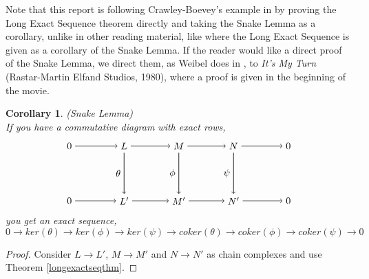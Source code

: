 \documentclass[11.5pt, twoside, a4paper, titlepage]{report}
\theoremstyle{definition}
\theoremstyle{plain}
\newtheorem{cor}[mydef]{Corollary}
\begin{document}
Note that this report is following Crawley-Boevey's example in \cite{CB1} by proving the Long Exact Sequence theorem directly and taking the Snake Lemma as a corollary, unlike in other reading material, like \cite{Weibel} where the Long Exact Sequence is given as a corollary of the Snake Lemma. If the reader would like a direct proof of the Snake Lemma, we direct them, as Weibel does in \cite{Weibel}, to \emph{It's My Turn} (Rastar-Martin Elfand Studios, 1980), where a proof is given in the beginning of the movie.

\begin{cor} (Snake Lemma)\\
If you have a commutative diagram with exact rows, 
\begin{equation*}
\begin{tikzpicture}[->,-latex, auto, main path/.style={->, semithick}, main node/.style={}]

\node	[main node]		(2) at (2,0)		{$0$};
\node	[main node]		(3) at (4,0)		{$L$};
\node [main node]		(4) at (6,0)		{$M$};
\node [main node]		(5) at (8,0)		{$N$};
\node	[main node]		(11) at (10,0)	{$0$};


\node	[main node]		(7) at (2,-2)		{$0$};
\node	[main node]		(8) at (4,-2)		{$L'$};
\node [main node]		(9) at (6,-2)		{$M'$};
\node [main node]		(10) at (8,-2)	{$N'$};
\node [main node]		(13) at (10,-2)	{$0$};

\draw (2) edge [main path] node [auto] {$$} (3);
\draw (3) edge [main path]node [auto] {$$} (4);
\draw (4) edge [main path] node [auto] {$$} (5);
\draw (5) edge [main path] (11);

\draw (7) edge [main path] node [auto] {$$} (8);
\draw (8) edge [main path] (9);
\draw (9) edge [main path] (10);
\draw (10) edge [main path] (13);


\draw (3) edge [main path] node [auto, swap] {$\theta$} (8);
\draw (4) edge [main path] node [auto, swap] {$\phi$} (9);
\draw (5) edge [main path] node [auto, swap] {$\psi$} (10);

\end{tikzpicture}
\end{equation*}
you get an exact sequence, 
\begin{equation*}
0\xrightarrow{}ker(\theta)\xrightarrow{}ker(\phi)\xrightarrow{}ker(\psi)\xrightarrow{}coker(\theta)\xrightarrow{}coker(\phi)\xrightarrow{}coker(\psi)\xrightarrow{}0
\end{equation*}
\end{cor}
\begin{proof}
Consider $L\to L'$, $M\to M'$ and $N\to N'$ as chain complexes and use Theorem \ref{longexactseqthm}.
\end{proof}
\end{document}
